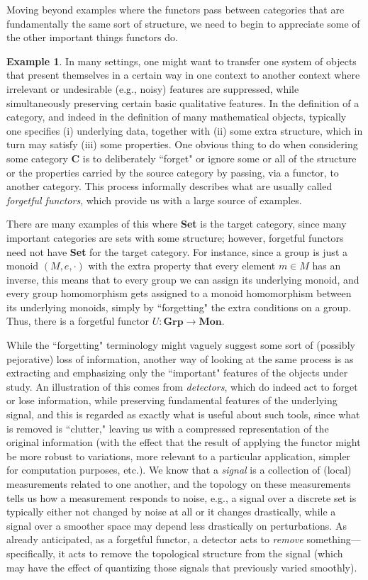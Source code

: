 \documentclass[11pt]{book}
\theoremstyle{definition}
\newtheorem{example}{Example}[section]
\theoremstyle{definition}
\theoremstyle{definition}
\theoremstyle{theorem}
\theoremstyle{definition}
\begin{document}
Moving beyond examples where the functors pass between categories that are fundamentally the same sort of structure, we need to begin to appreciate some of the other important things functors do. 
\begin{example}
	In many settings, one might want to transfer one system of objects that present themselves in a certain way in one context to another context where irrelevant or undesirable (e.g., noisy) features are suppressed, while simultaneously preserving certain basic qualitative features. In the definition of a category, and indeed in the definition of many mathematical objects, typically one specifies (i) underlying data, together with (ii) some extra structure, which in turn may satisfy (iii) some properties. One obvious thing to do when considering some category $\textbf{C}$ is to deliberately ``forget" or ignore some or all of the structure or the properties carried by the source category by passing, via a functor, to another category. This process informally describes what are usually called \textit{forgetful functors},  which provide us with a large source of examples.\par
	There are many examples of this where \textbf{Set} is the target category, since many important categories are sets with some structure; however, forgetful functors need not have \textbf{Set} for the target category. For instance, since a group is just a monoid $(M, e, \cdot)$ with the extra property that every element $m \in M$ has an inverse, this means that to every group we can assign its underlying monoid, and every group homomorphism gets assigned to a monoid homomorphism between its underlying monoids, simply by ``forgetting" the extra conditions on a group. Thus, there is a forgetful functor $U: \textbf{Grp} \rightarrow \textbf{Mon}$. \par 
	While the ``forgetting" terminology might vaguely suggest some sort of (possibly pejorative) loss of information, another way of looking at the same process is as extracting and emphasizing only the ``important" features of the objects under study. An illustration of this comes from \textit{detectors},  which do indeed act to forget or lose information, while preserving fundamental features of the underlying signal, and this is regarded as exactly what is useful about such tools, since what is removed is ``clutter," leaving us with a compressed representation of the original information (with the effect that the result of applying the functor might be more robust to variations, more relevant to a particular application, simpler for computation purposes, etc.). We know that a \textit{signal} is a collection of (local) measurements related to one another, and the topology on these measurements tells us how a measurement responds to noise, e.g., a signal over a discrete set is typically either not changed by noise at all or it changes drastically, while a signal over a smoother space may depend less drastically on perturbations. As already anticipated, as a forgetful functor, a detector acts to \textit{remove} something---specifically, it acts to remove the topological structure from the signal (which may have the effect of quantizing those signals that previously varied smoothly). \par 

\end{example}
\end{document}
